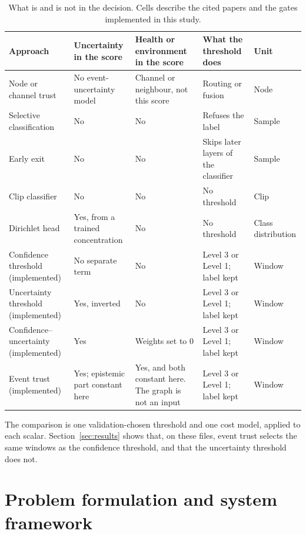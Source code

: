 \documentclass[sn-mathphys-num]{sn-jnl}%
\theoremstyle{thmstyleone}%
\theoremstyle{thmstyletwo}%
\theoremstyle{thmstylethree}%
\begin{document}
\begin{table}[!htbp]
\centering
\caption{What is and is not in the decision. Cells describe the cited papers and the gates implemented in this study.}
\label{tab:gap}
\footnotesize
\setlength{\tabcolsep}{3pt}
\begin{tabular}{|p{3.4cm}|p{2.5cm}|p{2.7cm}|p{2.5cm}|p{2.0cm}|}
\hline
\textbf{Approach} & \textbf{Uncertainty in the score} & \textbf{Health or environment in the score} & \textbf{What the threshold does} & \textbf{Unit} \\
\hline
Node or channel trust \cite{signori2022,song2025,he2024,xia2026} & No event-uncertainty model & Channel or neighbour, not this score & Routing or fusion & Node \\
\hline
Selective classification \cite{geifman2017} & No & No & Refuses the label & Sample \\
\hline
Early exit \cite{teerapittayanon2016} & No & No & Skips later layers of the classifier & Sample \\
\hline
Clip classifier \cite{irfan2021,bohnenstiehl2023} & No & No & No threshold & Clip \\
\hline
Dirichlet head \cite{sensoy2018} & Yes, from a trained concentration & No & No threshold & Class distribution \\
\hline
Confidence threshold (implemented) & No separate term & No & Level 3 or Level 1; label kept & Window \\
\hline
Uncertainty threshold (implemented) & Yes, inverted & No & Level 3 or Level 1; label kept & Window \\
\hline
Confidence--uncertainty (implemented) & Yes & Weights set to 0 & Level 3 or Level 1; label kept & Window \\
\hline
Event trust (implemented) & Yes; epistemic part constant here & Yes, and both constant here. The graph is not an input & Level 3 or Level 1; label kept & Window \\
\hline
\end{tabular}
\end{table}

The comparison is one validation-chosen threshold and one cost model, applied to each scalar. Section~\ref{sec:results} shows that, on these files, event trust selects the same windows as the confidence threshold, and that the uncertainty threshold does not.

\section{Problem formulation and system framework}\label{sec:framework}
\end{document}
